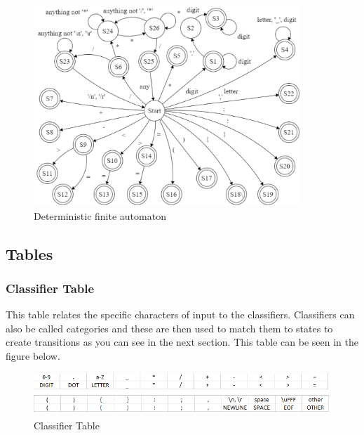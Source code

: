 \documentclass{article}
\begin{document}
				\begin{center}
					\begin{figure}[H]
			 			\includegraphics[width=0.9\textwidth]{automaton.png}
			 			\centering
			  			\caption{Deterministic finite automaton}
			  			\label{fig:automaton}
					\end{figure}
				\end{center}
				
				\subsection{Tables}
				
				\subsubsection{Classifier Table}
				This table relates the specific characters of input to the classifiers. Classifiers can also be called categories and these are then used to match them to states to create transitions as you can see in the next section. This table can be seen in the figure below.
				
				\begin{center}
					\begin{figure}[H]
			 			\includegraphics[width=\textwidth]{table3.png}
			  			\caption{Classifier Table}
			  			\label{fig:cat}
					\end{figure}
				\end{center}
				
\end{document}
